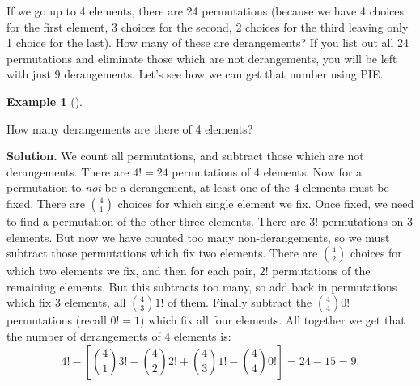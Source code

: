 \documentclass[10pt,]{book}
\theoremstyle{plain}
\theoremstyle{definition}
\newtheorem{example}[theorem]{Example}
\theoremstyle{definition}
\theoremstyle{definition}
\numberwithin{equation}{chapter}
\begin{document}
      If we go up to 4 elements, there are 24 permutations (because we have 4 choices for the first element, 3 choices for the second, 2 choices for the third leaving only 1 choice for the last). How many of these are derangements? If you list out all 24 permutations and eliminate those which are not derangements, you will be left with just 9 derangements. Let's see how we can get that number using PIE.
\begin{example}[]\label{example-49}

          How many derangements are there of 4 elements?
\par\medskip\noindent%
\textbf{Solution.}\quad
          We count all permutations, and subtract those which are not derangements. There are \(4! = 24\) permutations of 4 elements. Now for a permutation to \emph{not} be a derangement, at least one of the 4 elements must be fixed. There are \({4 \choose 1}\) choices for which single element we fix. Once fixed, we need to find a permutation of the other three elements. There are \(3!\) permutations on 3 elements. But now we have counted too many non-derangements, so we must subtract those permutations which fix two elements. There are \({4 \choose 2}\) choices for which two elements we fix, and then for each pair, \(2!\) permutations of the remaining elements. But this subtracts too many, so add back in permutations which fix 3 elements, all \({4 \choose 3}1!\) of them. Finally subtract the \({4 \choose 4}0!\) permutations (recall \(0! = 1\)) which fix all four elements. All together we get that the number of derangements of 4 elements is:
          \begin{equation*}
            4! - \left[{4 \choose 1}3! - {4 \choose 2}2! + {4 \choose 3} 1! - {4 \choose 4}0!\right] = 24 - 15 = 9.
          \end{equation*}
\end{example}
\par
\end{document}
